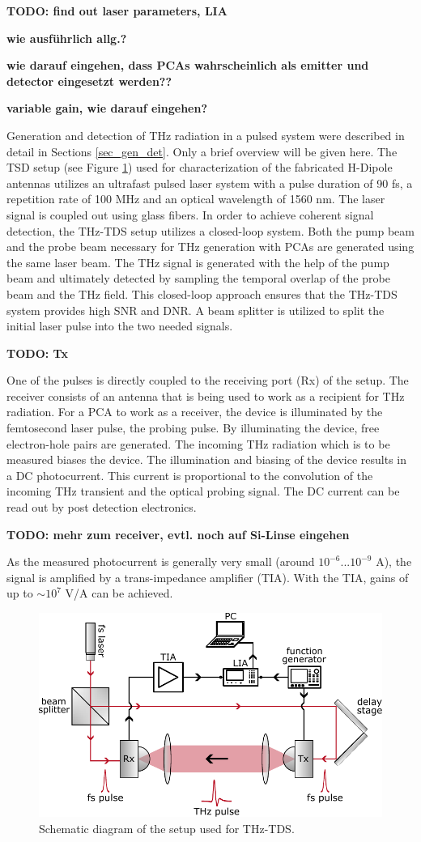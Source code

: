 \textbf{TODO: find out laser parameters, LIA} 

\textbf{wie ausführlich allg.?}

\textbf{wie darauf eingehen, dass PCAs wahrscheinlich als emitter und detector eingesetzt werden??}

\textbf{variable gain, wie darauf eingehen?}

Generation and detection of THz radiation in a pulsed system were described in detail in Sections \ref{sec_gen_det}. Only a brief overview will be given here. The TSD setup (see Figure \ref{fig_TDS}) used for characterization of the fabricated H-Dipole antennas utilizes an ultrafast pulsed laser system with a pulse duration of \num{90} \si{\femto \s}, a repetition rate of \num{100} \si{\mega \hertz} and an optical wavelength of \num{1560} \si{\nano \meter}. The laser signal is coupled out using glass fibers. In order to achieve coherent signal detection, the THz-TDS setup utilizes a closed-loop system. Both the pump beam and the probe beam necessary for THz generation with PCAs are generated using the same laser beam. The THz signal is generated with the help of the pump beam and ultimately detected by sampling the temporal overlap of the probe beam and the THz field. This closed-loop approach ensures that the THz-TDS system provides high SNR and DNR. A beam splitter is utilized to split the initial laser pulse into the two needed signals. 

\textbf{TODO: Tx}

One of the pulses is directly coupled to the receiving port (Rx) of the setup. The receiver consists of an antenna that is being used to work as a recipient for THz radiation. For a PCA to work as a receiver, the device is illuminated by the femtosecond laser pulse, the probing pulse. By illuminating the device, free electron-hole pairs are generated. The incoming THz radiation which is to be measured biases the device. The illumination and biasing of the device results in a DC photocurrent. This current is proportional to the convolution of the incoming THz transient and the optical probing signal. The DC current can be read out by post detection electronics. 

\textbf{TODO: mehr zum receiver, evtl. noch auf Si-Linse eingehen}

As the measured photocurrent is generally very small (around $10^{-6} ... 10^{-9}$ \si{\ampere}), the signal is amplified by a trans-impedance amplifier (TIA).  With the TIA, gains of up to $\sim 10^7 $ \si{\volt}/\si{\ampere} can be achieved.

\begin{figure}[ht]
    \includegraphics[width=0.9\linewidth]{figures/TDS_schematic.pdf}
    \centering
    \caption{Schematic diagram of the setup used for THz-TDS.}
    \label{fig_TDS}
\end{figure}

